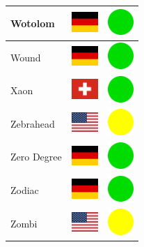 \documentclass[12pt, a4paper, twoside]{report}
\begin{document}
\begin{center}
\begin{longtable}{|p{5cm}|p{2cm}|p{2cm}|}
Wotolom & \includegraphics[width=1cm]{4x3/de} & \includegraphics[width=1cm]{likes/y} \\ \hline
Wound & \includegraphics[width=1cm]{4x3/de} & \includegraphics[width=1cm]{likes/y} \\ \hline
Xaon & \includegraphics[width=1cm]{4x3/ch} & \includegraphics[width=1cm]{likes/y} \\ \hline
Zebrahead & \includegraphics[width=1cm]{4x3/us} & \includegraphics[width=1cm]{likes/m} \\ \hline
Zero Degree & \includegraphics[width=1cm]{4x3/de} & \includegraphics[width=1cm]{likes/y} \\ \hline
Zodiac & \includegraphics[width=1cm]{4x3/de} & \includegraphics[width=1cm]{likes/y} \\ \hline
Zombi & \includegraphics[width=1cm]{4x3/us} & \includegraphics[width=1cm]{likes/m} \\ \hline
		\end{longtable}
	\end{center}
\end{document}
